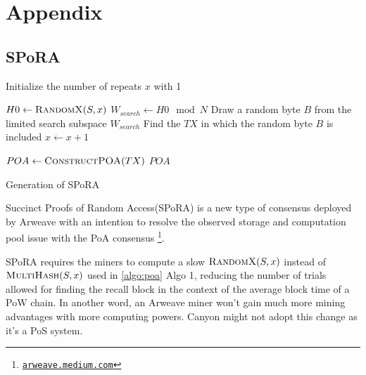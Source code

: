 \documentclass[]{article}
\begin{document}
\appendix
\section{Appendix}

\subsection{SPoRA}

\IncMargin{1em}
\begin{algorithm}
    \label{algo:spora}

    \SetAlgoNoLine

    \BlankLine

    Initialize the number of repeats $x$ with 1\;
    \BlankLine

    \Repeat
        {}
        {
        $H0 \leftarrow \Call{RandomX}{S, x}$\;
        $W_{search} \leftarrow H0 \mod N$\;
        Draw a random byte $B$ from the limited search subspace $W_{search}$\;
        Find the $TX$ in which the random byte $B$ is included\;
        {$x \leftarrow x + 1$}\;
    }

    \BlankLine
    $POA \leftarrow \Call{ConstructPOA}{TX}$\;
    \Return $POA$\;
    \caption{Generation of SPoRA}
\end{algorithm}
\DecMargin{1em}

Succinct Proofs of Random Access(SPoRA) is a new type of consensus deployed by Arweave with an intention to resolve the observed storage and computation pool issue with the PoA consensus \footnote{\href{https://arweave.medium.com/the-arweave-network-is-now-running-succinct-random-proofs-of-access-spora-e2732cbcbb46}{\nolinkurl{arweave.medium.com}}}.

SPoRA requires the miners to compute a slow $\Call{RandomX}{S, x}$ instead of $\Call{MultiHash}{S, x}$ used in \ref{algo:poa}{ Algo 1}, reducing the number of trials allowed for finding the recall block in the context of the average block time of a PoW chain. In another word, an Arweave miner won't gain much more mining advantages with more computing powers. Canyon might not adopt this change as it's a PoS system.
\end{document}
